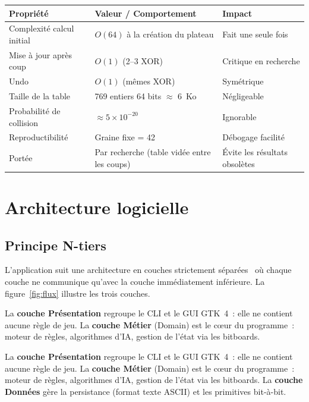 \documentclass[a4paper,11pt]{article}
\begin{document}
\begin{center}
\renewcommand{\arraystretch}{1.3}
\begin{tabular}{lll}
\toprule
\textbf{Propriété} & \textbf{Valeur / Comportement} & \textbf{Impact} \\
\midrule
Complexité calcul initial & $O(64)$ à la création du plateau & Fait une seule fois \\
Mise à jour après coup    & $O(1)$ (2--3 XOR) & Critique en recherche \\
Undo                      & $O(1)$ (mêmes XOR) & Symétrique \\
Taille de la table        & 769 entiers 64 bits $\approx$ 6~Ko & Négligeable \\
Probabilité de collision  & $\approx 5\times 10^{-20}$ & Ignorable \\
Reproductibilité          & Graine fixe = 42 & Débogage facilité \\
Portée & Par recherche (table vidée entre les coups) & Évite les résultats obsolètes\\
\bottomrule
\end{tabular}
\end{center}

\section{Architecture logicielle}
\label{sec:archi}

\subsection{Principe N-tiers}

L'application suit une architecture en couches strictement séparées~\cite{Fowler2002}
où chaque couche ne communique qu'avec la couche immédiatement inférieure.
La figure~\ref{fig:flux} illustre les trois couches.

La \textbf{couche Présentation} regroupe le CLI et le GUI GTK~4~: elle ne
contient aucune règle de jeu. La \textbf{couche Métier} (Domain) est le cœur
du programme~: moteur de règles, algorithmes d'IA, gestion de l'état via les
bitboards.

La \textbf{couche Présentation} regroupe le CLI et le GUI GTK~4~: elle ne
contient aucune règle de jeu. La \textbf{couche Métier} (Domain) est le cœur
du programme~: moteur de règles, algorithmes d'IA, gestion de l'état via les
bitboards. La \textbf{couche Données} gère la persistance (format texte ASCII)
et les primitives bit-à-bit.
\end{document}
